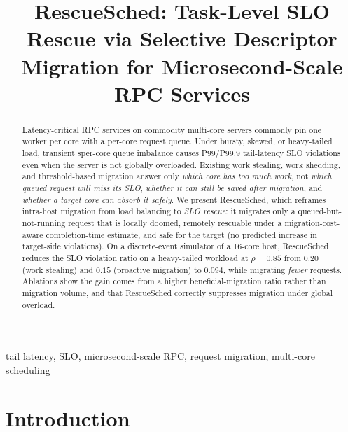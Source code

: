 \documentclass[conference]{IEEEtran}
\begin{document}
\title{RescueSched: Task-Level SLO Rescue via Selective Descriptor
Migration for Microsecond-Scale RPC Services}

\author{%
}

\maketitle

\begin{abstract}
Latency-critical RPC services on commodity multi-core servers commonly
pin one worker per core with a per-core request queue. Under bursty,
skewed, or heavy-tailed load, transient sper-core queue imbalance causes
P99/P99.9 tail-latency SLO violations even when the server is not
globally overloaded. Existing work stealing, work shedding, and
threshold-based migration answer only \emph{which core has too much
work}, not \emph{which queued request will miss its SLO}, \emph{whether
it can still be saved after migration}, and \emph{whether a target core
can absorb it safely}. We present RescueSched, which reframes intra-host
migration from load balancing to \emph{SLO rescue}: it migrates only a
queued-but-not-running request that is locally doomed, remotely
rescuable under a migration-cost-aware completion-time estimate, and
safe for the target (no predicted increase in target-side violations).
On a discrete-event simulator of a 16-core host, RescueSched reduces the
SLO violation ratio on a heavy-tailed workload at $\rho{=}0.85$ from
$0.20$ (work stealing) and $0.15$ (proactive migration) to $0.094$,
while migrating \emph{fewer} requests. Ablations show the gain comes
from a higher beneficial-migration ratio rather than migration volume,
and that RescueSched correctly suppresses migration under global
overload.
\end{abstract}

\begin{IEEEkeywords}
tail latency, SLO, microsecond-scale RPC, request migration, multi-core
scheduling
\end{IEEEkeywords}

\section{Introduction}
\label{sec:intro}

\end{document}
